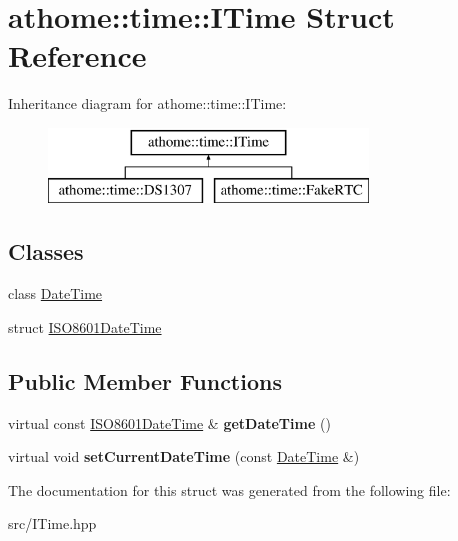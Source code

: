 \hypertarget{structathome_1_1time_1_1_i_time}{}\section{athome\+:\+:time\+:\+:I\+Time Struct Reference}
\label{structathome_1_1time_1_1_i_time}
Inheritance diagram for athome\+:\+:time\+:\+:I\+Time\+:\begin{figure}[H]
\begin{center}
\leavevmode
\includegraphics[height=2.000000cm]{structathome_1_1time_1_1_i_time}
\end{center}
\end{figure}
\subsection*{Classes}
\begin{DoxyCompactItemize}
\item 
class \mbox{\hyperlink{classathome_1_1time_1_1_i_time_1_1_date_time}{Date\+Time}}
\item 
struct \mbox{\hyperlink{structathome_1_1time_1_1_i_time_1_1_i_s_o8601_date_time}{I\+S\+O8601\+Date\+Time}}
\end{DoxyCompactItemize}
\subsection*{Public Member Functions}
\begin{DoxyCompactItemize}
\item 
\mbox{\label{structathome_1_1time_1_1_i_time_a90ac2ac85c3e23e564a2329cff32a138}} 
virtual const \mbox{\hyperlink{structathome_1_1time_1_1_i_time_1_1_i_s_o8601_date_time}{I\+S\+O8601\+Date\+Time}} \& {\bfseries get\+Date\+Time} ()
\item 
\mbox{\label{structathome_1_1time_1_1_i_time_a90003ec8efdf7047814426c4056b4b69}} 
virtual void {\bfseries set\+Current\+Date\+Time} (const \mbox{\hyperlink{classathome_1_1time_1_1_i_time_1_1_date_time}{Date\+Time}} \&)
\end{DoxyCompactItemize}


The documentation for this struct was generated from the following file\+:\begin{DoxyCompactItemize}
\item 
src/I\+Time.\+hpp\end{DoxyCompactItemize}
